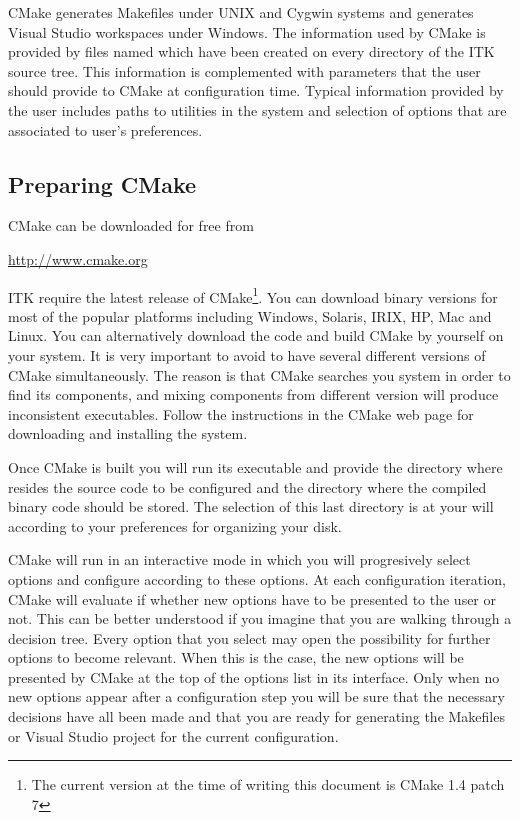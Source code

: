 CMake generates Makefiles under UNIX and Cygwin systems and generates Visual
Studio workspaces under Windows. The information used by CMake is provided by
files named  which have been created on every directory
of the ITK source tree. This information is complemented with parameters that
the user should provide to CMake at configuration time. Typical information
provided by the user includes paths to utilities in the system and selection
of options that are associated to user's preferences.

\subsection{Preparing CMake}
\label{sec:CMakeforITK}
 

CMake can be downloaded for free from 
\begin{center} 
  \url{http://www.cmake.org}
\end{center}

ITK require the latest release of CMake\footnote{The current version at the
time of writing this document is CMake 1.4 patch 7}. You can download binary
versions for most of the popular platforms including Windows, Solaris, IRIX,
HP, Mac and Linux. You can alternatively download the code and build CMake by
yourself on your system. It is very important to avoid to have several
different versions of CMake simultaneously. The reason is that CMake searches
you system in order to find its components, and mixing components from
different version will produce inconsistent executables. Follow the
instructions in the CMake web page for downloading and installing the system.

Once CMake is built you will run its executable and provide the directory
where resides the source code to be configured and the directory where the
compiled binary code should be stored. The selection of this last directory
is at your will according to your preferences for organizing your disk.

CMake will run in an interactive mode in which you will progresively select
options and configure according to these options. At each configuration
iteration, CMake will evaluate if whether new options have to be presented to
the user or not. This can be better understood if you imagine that you are
walking through a decision tree.  Every option that you select may open the
possibility for further options to become relevant. When this is the case,
the new options will be presented by CMake at the top of the options list in
its interface.  Only when no new options appear after a configuration step
you will be sure that the necessary decisions have all been made and that you
are ready for generating the Makefiles or Visual Studio project for the
current configuration.

